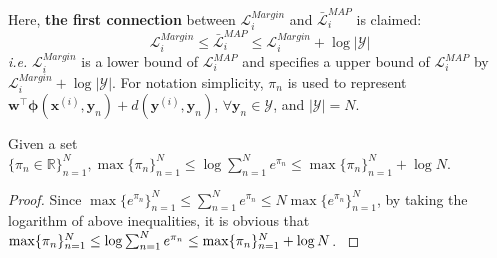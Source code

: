 Here, \textbf{the first connection} between $\mathcal{L}^{Margin}_i$ and $\bar{\mathcal{L}}^{MAP}_i$ is claimed:   
\begin{equation}
    \mathcal{L}^{Margin}_i \leq \bar{\mathcal{L}}^{MAP}_i\leq\mathcal{L}^{Margin}_i+\log |\mathcal{Y}|
    \label{equ:bound}
\end{equation}
\emph{i.e.} $\mathcal{L}^{Margin}_i$  
is a lower bound of $\mathcal{L}^{MAP}_i$ and specifies a upper bound of $\mathcal{L}^{MAP}_i$ by $\mathcal{L}^{Margin}_i+\log |\mathcal{Y}|$. For notation simplicity, $\pi_n$ is used to represent  
$\mathbf{w}^\top \boldsymbol{\phi}(\mathbf{x}^{(i)},\mathbf{y}_n)+d(\mathbf{y}^{(i)},\mathbf{y}_n)$, $\forall \mathbf{y}_n\in\mathcal{Y}$, and $|\mathcal{Y}|=N$. 
\begin{proposition}
    Given a set $\{\pi_n\in\mathbb{R}\}_{n=1}^N, \max\{\pi_n\}_{n=1}^N \leq \log\sum_{n=1}^N e^{\pi_n}\leq \max\{\pi_n\}_{n=1}^N+\log N$. 
\label{pro:bound}
\end{proposition}

\begin{proof}
    Since $\max\{e^{\pi_n}\}_{n=1}^N \leq \sum_{n=1}^N e^{\pi_n}\leq  N \max\{e^{\pi_n}\}_{n=1}^N$, 
    by taking the logarithm of above inequalities, it is obvious that    
    $\max\{\pi_n\}_{n=1}^N \leq \log\sum_{n=1}^N e^{\pi_n}\leq \max\{\pi_n\}_{n=1}^N\\+\log N$. 
    \label{proof:bound}
\end{proof}

